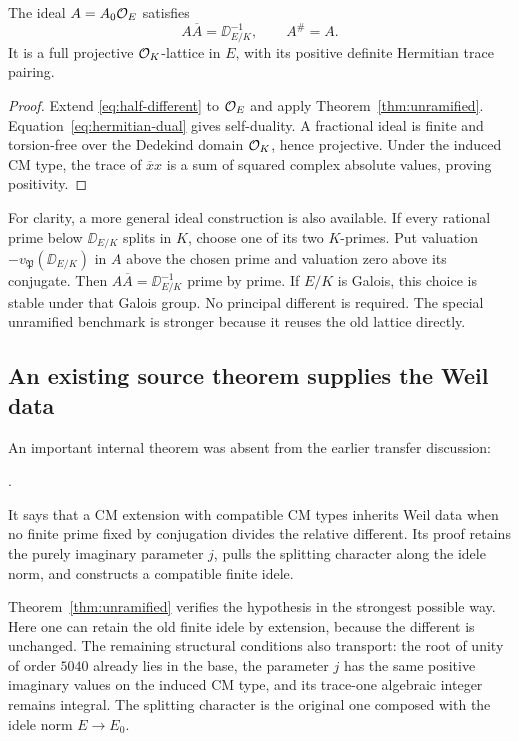 \begin{corollary}
The ideal $A=A_0\mathcal O_E$ satisfies
\[
 A\overline A=\DD_{E/K}^{-1},\qquad A^\#=A.
\]
It is a full projective $\mathcal O_K$-lattice in $E$, with its positive definite Hermitian trace pairing.
\end{corollary}

\begin{proof}
Extend \eqref{eq:half-different} to $\mathcal O_E$ and apply Theorem~\ref{thm:unramified}. Equation~\eqref{eq:hermitian-dual} gives self-duality. A fractional ideal is finite and torsion-free over the Dedekind domain $\mathcal O_K$, hence projective. Under the induced CM type, the trace of $\overline x x$ is a sum of squared complex absolute values, proving positivity.
\end{proof}

For clarity, a more general ideal construction is also available. If every rational prime below $\DD_{E/K}$ splits in $K$, choose one of its two $K$-primes. Put valuation $-v_{\mathfrak P}(\DD_{E/K})$ in $A$ above the chosen prime and valuation zero above its conjugate. Then $A\overline A=\DD_{E/K}^{-1}$ prime by prime. If $E/K$ is Galois, this choice is stable under that Galois group. No principal different is required. The special unramified benchmark is stronger because it reuses the old lattice directly.

\subsection{An existing source theorem supplies the Weil data}

An important internal theorem was absent from the earlier transfer discussion:
\begin{center}
.
\end{center}
It says that a CM extension with compatible CM types inherits Weil data when no finite prime fixed by conjugation divides the relative different. Its proof retains the purely imaginary parameter $j$, pulls the splitting character along the idele norm, and constructs a compatible finite idele.\cite{grunwald}

Theorem~\ref{thm:unramified} verifies the hypothesis in the strongest possible way. Here one can retain the old finite idele by extension, because the different is unchanged. The remaining structural conditions also transport: the root of unity of order $5040$ already lies in the base, the parameter $j$ has the same positive imaginary values on the induced CM type, and its trace-one algebraic integer remains integral. The splitting character is the original one composed with the idele norm $E\to E_0$.

